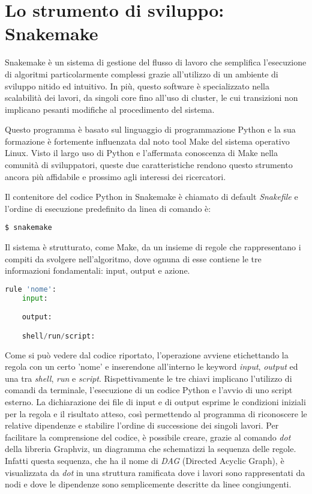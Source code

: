 \section{Lo strumento di sviluppo: Snakemake}
Snakemake è un sistema di gestione del flusso di lavoro che semplifica l'esecuzione di algoritmi particolarmente complessi grazie all'utilizzo di un ambiente di sviluppo nitido ed intuitivo.
In più, questo software è specializzato nella scalabilità dei lavori, da singoli core fino all'uso di cluster, le cui transizioni non implicano pesanti modifiche al procedimento del sistema.

Questo programma è basato sul linguaggio di programmazione Python e la sua formazione è fortemente influenzata dal noto tool Make del sistema operativo Linux.
Visto il largo uso di Python e l'affermata conoscenza di Make nella comunità di sviluppatori, queste due caratteristiche rendono questo strumento ancora più affidabile e prossimo agli interessi dei ricercatori.

Il contenitore del codice Python in Snakemake è chiamato di default \textit{Snakefile} e l'ordine di esecuzione predefinito da linea di comando è:
\begin{lstlisting}
$ snakemake
\end{lstlisting}
Il sistema è strutturato, come Make, da un insieme di regole che rappresentano i compiti da svolgere nell'algoritmo, dove ognuna di esse contiene le tre informazioni fondamentali: input, output e azione.
\begin{lstlisting}[language=Python]
rule 'nome':
	input:

	output:

	shell/run/script:

\end{lstlisting}
Come si può vedere dal codice riportato, l'operazione avviene etichettando la regola con un certo 'nome' e inserendone all'interno le keyword \textit{input}, \textit{output} ed una tra \textit{shell}, \textit{run} e \textit{script}.
Rispettivamente le tre chiavi implicano l'utilizzo di comandi da terminale, l'esecuzione di un codice Python e l'avvio di uno script esterno.
La dichiarazione dei file di input e di output esprime le condizioni iniziali per la regola e il risultato atteso, così permettendo al programma di riconoscere le relative dipendenze e stabilire l'ordine di successione dei singoli lavori.
Per facilitare la comprensione del codice, è possibile creare, grazie al comando \textit{dot} della libreria Graphviz, un diagramma che schematizzi la sequenza delle regole.
Infatti questa sequenza, che ha il nome di \textit{DAG} (Directed Acyclic Graph), è visualizzata da \textit{dot} in una struttura ramificata dove i lavori sono rappresentati da nodi e dove le dipendenze sono semplicemente descritte da linee congiungenti. 
 

